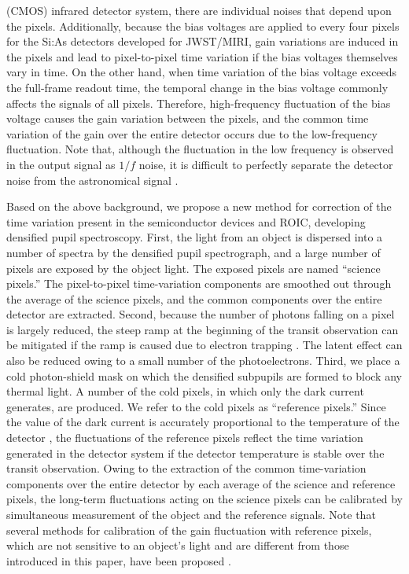 \documentclass{aastex62}
\begin{document}
(CMOS) infrared detector system, there are individual noises that depend upon the pixels. Additionally, because the bias voltages are applied to every four pixels for the Si:As detectors developed for JWST/MIRI, gain variations are induced in the pixels and lead to pixel-to-pixel time variation if the bias voltages themselves vary in time. On the other hand, when time variation of the bias voltage exceeds the full-frame readout time, the temporal change in the bias voltage commonly affects the signals of all pixels. Therefore, high-frequency fluctuation of the bias voltage causes the gain variation between the pixels, and the common time variation of the gain over the entire detector occurs due to the low-frequency fluctuation. Note that, although the fluctuation in the low frequency is observed in the output signal as $1/f$ noise, it is difficult to perfectly separate the detector noise from the astronomical signal \citep{2014JWST.003852..12, 2015PASP..127.1144R}.

Based on the above background, we propose a new method for correction of the time variation present in the semiconductor devices and ROIC, developing densified pupil spectroscopy. First, the light from an object is dispersed into a number of spectra by the densified pupil spectrograph, and a large number of pixels are exposed by the object light. The exposed pixels are named “science pixels.” The pixel-to-pixel time-variation components are smoothed out through the average of the science pixels, and the common components over the entire detector are extracted. Second, because the number of photons falling on a pixel is largely reduced, the steep ramp at the beginning of the transit observation can be mitigated if the ramp is caused due to electron trapping \citep[e.g.,][]{2003SPIE.4850...98Y, 2012ApJ...752...81C}. The latent effect can also be reduced owing to a small number of the photoelectrons. Third, we place a cold photon-shield mask on which the densified subpupils are formed to block any thermal light. A number of the cold pixels, in which only the dark current generates, are produced. We refer to the cold pixels as “reference pixels.” Since the value of the dark current is accurately proportional to the temperature of the detector \citep[e.g.,][]{2003SPIE.4850..890E}, the fluctuations of the reference pixels reflect the time variation generated in the detector system if the detector temperature is stable over the transit observation. Owing to the extraction of the common time-variation components over the entire detector by each average of the science and reference pixels, the long-term fluctuations acting on the science pixels can be calibrated by simultaneous measurement of the object and the reference signals. Note that several methods for calibration of the gain fluctuation with reference pixels, which are not sensitive to an object's light and are different from those introduced in this paper, have been proposed \citep[e.g.,][]{2017PASP..129j5003R, 2007ARA&A..45...77R}.
\end{document}
